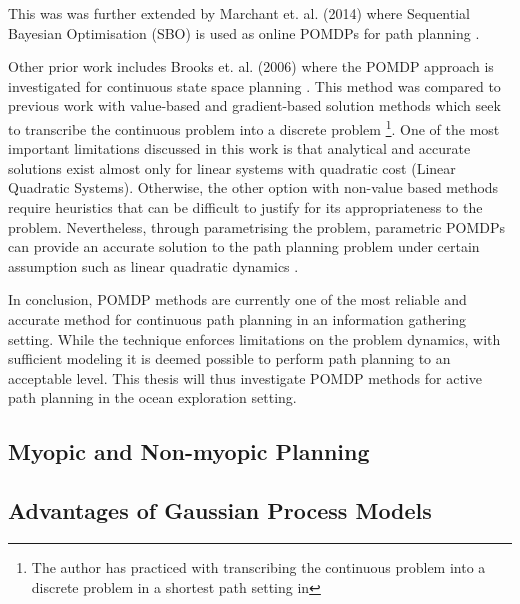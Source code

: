 		This was was further extended by Marchant et. al. (2014) where Sequential Bayesian Optimisation (SBO) is used as online POMDPs for path planning \citep{SequentialBayesianOptimisation}.
		
		Other prior work includes Brooks et. al. (2006) where the POMDP approach is investigated for continuous state space planning \citep{ParametricPOMDP}. This method was compared to previous work with value-based and gradient-based solution methods which seek to transcribe the continuous problem into a discrete problem \footnote{{\color{BurntOrange} The author has practiced with transcribing the continuous problem into a discrete problem in a shortest path setting in}}. One of the most important limitations discussed in this work is that analytical and accurate solutions exist almost only for linear systems with quadratic cost (Linear Quadratic Systems). Otherwise, the other option with non-value based methods require heuristics that can be difficult to justify for its appropriateness to the problem. Nevertheless, through parametrising the problem, parametric POMDPs can provide an accurate solution to the path planning problem under certain assumption such as linear quadratic dynamics \citep{ParametricPOMDP}.
		
		In conclusion, POMDP methods are currently one of the most reliable and accurate method for continuous path planning in an information gathering setting. While the technique enforces limitations on the problem dynamics, with sufficient modeling it is deemed possible to perform path planning to an acceptable level. This thesis will thus investigate POMDP methods for active path planning in the ocean exploration setting.
		
		\subsection{Myopic and Non-myopic Planning}
		
		\subsection{Advantages of Gaussian Process Models}